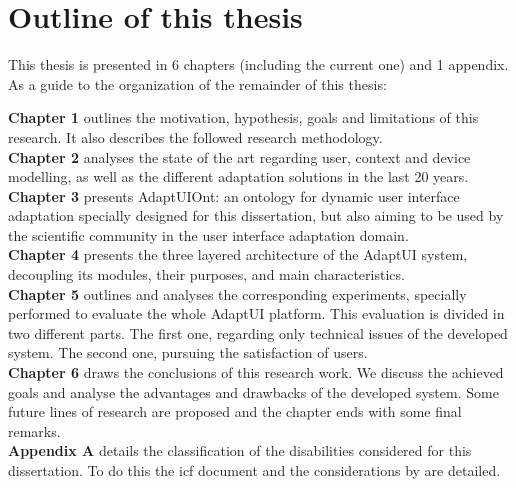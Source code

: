
\section{Outline of this thesis}
\label{sec:outline}

This thesis is presented in 6 chapters (including the current one) and 1
appendix. As a guide to the organization of the remainder of this thesis:

\hspace*{5mm} \textbf{Chapter 1} outlines the motivation, hypothesis, goals and 
limitations of this research. It also describes the followed research 
methodology. \\

\hspace*{5mm} \textbf{Chapter 2} analyses the state of the art regarding user, 
context and device modelling, as well as the different adaptation solutions in 
the last 20 years. \\

\hspace*{5mm} \textbf{Chapter 3} presents AdaptUIOnt: an ontology for 
dynamic user interface adaptation specially designed for this dissertation, 
but also aiming to be used by the scientific community in the user interface 
adaptation domain.\\

\hspace*{5mm} \textbf{Chapter 4} presents the three layered architecture of 
the AdaptUI system, decoupling its modules, their purposes, and main 
characteristics.\\

\hspace*{5mm} \textbf{Chapter 5} outlines and analyses the corresponding
experiments, specially performed to evaluate the whole AdaptUI platform. This
evaluation is divided in two different parts. The first one, regarding only
technical issues of the developed system. The second one, pursuing the 
satisfaction of users.\\

\hspace*{5mm} \textbf{Chapter 6} draws the conclusions of this research work. We 
discuss the achieved goals and analyse the advantages and drawbacks of the 
developed system. Some future lines of research are proposed and the chapter 
ends with some final remarks.\\

\hspace*{5mm} \textbf{Appendix A} details the classification of the disabilities
considered for this dissertation. To do this the \ac{icf} document and the
considerations by \citet{persad_characterising_2007} are detailed.\\

% 
